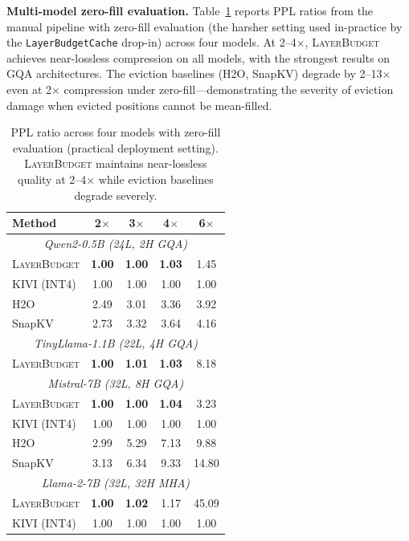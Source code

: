 \documentclass{article}
\newcommand{\layerbudget}{\textsc{LayerBudget}\xspace}
\begin{document}
\textbf{Multi-model zero-fill evaluation.}
Table~\ref{tab:e2e} reports PPL ratios from the manual pipeline with zero-fill evaluation (the harsher setting used in-practice by the \texttt{LayerBudgetCache} drop-in) across four models.
At 2--4$\times$, \layerbudget achieves near-lossless compression on all models, with the strongest results on GQA architectures.
The eviction baselines (H2O, SnapKV) degrade by 2--13$\times$ even at 2$\times$ compression under zero-fill---demonstrating the severity of eviction damage when evicted positions cannot be mean-filled.

\begin{table}[t]
\centering
\caption{PPL ratio across four models with zero-fill evaluation (practical deployment setting). \layerbudget maintains near-lossless quality at 2--4$\times$ while eviction baselines degrade severely.}
\label{tab:e2e}
\small
\setlength{\tabcolsep}{3pt}
\begin{tabular}{@{}lcccc@{}}
\toprule
Method & 2$\times$ & 3$\times$ & 4$\times$ & 6$\times$ \\
\midrule
\multicolumn{5}{c}{\textit{Qwen2-0.5B (24L, 2H GQA)}} \\
\midrule
\layerbudget & \textbf{1.00} & \textbf{1.00} & \textbf{1.03} & 1.45 \\
KIVI (INT4)  & 1.00 & 1.00 & 1.00 & 1.00 \\
H2O          & 2.49 & 3.01 & 3.36 & 3.92 \\
SnapKV       & 2.73 & 3.32 & 3.64 & 4.16 \\
\midrule
\multicolumn{5}{c}{\textit{TinyLlama-1.1B (22L, 4H GQA)}} \\
\midrule
\layerbudget & \textbf{1.00} & \textbf{1.01} & \textbf{1.03} & 8.18 \\
\midrule
\multicolumn{5}{c}{\textit{Mistral-7B (32L, 8H GQA)}} \\
\midrule
\layerbudget & \textbf{1.00} & \textbf{1.00} & \textbf{1.04} & 3.23 \\
KIVI (INT4)  & 1.00 & 1.00 & 1.00 & 1.00 \\
H2O          & 2.99 & 5.29 & 7.13 & 9.88 \\
SnapKV       & 3.13 & 6.34 & 9.33 & 14.80 \\
\midrule
\multicolumn{5}{c}{\textit{Llama-2-7B (32L, 32H MHA)}} \\
\midrule
\layerbudget & \textbf{1.00} & \textbf{1.02} & 1.17 & 45.09 \\
KIVI (INT4)  & 1.00 & 1.00 & 1.00 & 1.00 \\
\bottomrule
\end{tabular}
\vspace{-0.1in}
\end{table}
\end{document}
